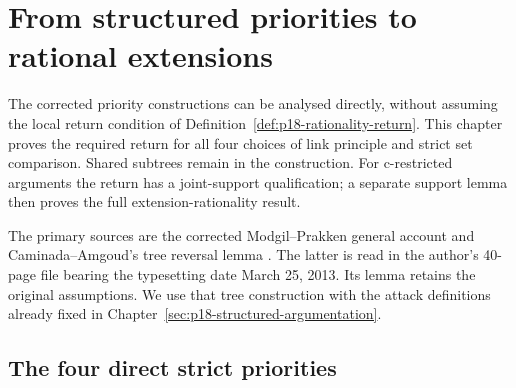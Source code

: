 \chapter{From structured priorities to rational extensions}
\label{sec:p18-structured-priority-rationality}

The corrected priority constructions can be analysed directly, without
assuming the local return condition of
Definition~\ref{def:p18-rationality-return}. This chapter proves the
required return for all four choices of link principle and strict set
comparison. Shared subtrees remain in the construction.
For c-restricted arguments the return has a joint-support qualification;
a separate support lemma then proves the full extension-rationality result.

The primary sources are the corrected Modgil--Prakken general account
\cite{ModgilPrakken2013GeneralCorrected} and Caminada--Amgoud's tree
reversal lemma \cite[Lemma 6]{CaminadaAmgoud2007Evaluation}.
The latter is read in the author's 40-page file bearing the typesetting
date March 25, 2013. Its lemma retains the original assumptions.
We use that tree construction with the attack definitions already fixed
in Chapter~\ref{sec:p18-structured-argumentation}.

\section{The four direct strict priorities}

